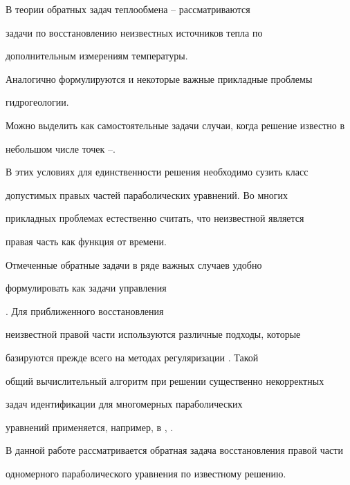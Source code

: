 \label{begin}











В теории обратных задач теплообмена \cite{b1}--\cite{b3} рассматриваются


задачи по восстановлению неизвестных источников тепла по


дополнительным измерениям температуры.


Аналогично формулируются и некоторые важные прикладные проблемы


гидрогеологии. 





Можно выделить как самостоятельные задачи случаи, когда решение известно в 


небольшом числе точек \cite{d1}--\cite{d3}. 


В этих условиях для единственности решения необходимо сузить класс


допустимых правых частей параболических уравнений. Во многих


прикладных проблемах естественно считать, что неизвестной является 


правая часть как функция от времени.





Отмеченные обратные задачи в ряде важных случаев удобно


формулировать как задачи управления


\cite{b4}. Для приближенного восстановления


неизвестной правой части используются различные подходы, которые


базируются прежде всего на методах регуляризации \cite{b5}. Такой


общий вычислительный алгоритм при решении существенно некорректных


задач идентификации для многомерных параболических


уравнений применяется, например, в \cite{b6}, \cite{g1}.








В данной работе рассматривается обратная задача восстановления правой части


одномерного параболического уравнения по известному решению.



